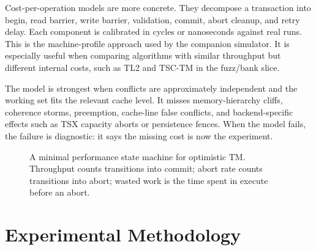 Cost-per-operation models are more concrete. They decompose a transaction into begin, read barrier, write barrier, validation, commit, abort cleanup, and retry delay. Each component is calibrated in cycles or nanoseconds against real runs. This is the machine-profile approach used by the companion simulator. It is especially useful when comparing algorithms with similar throughput but different internal costs, such as TL2 and TSC-TM in the fuzz/bank slice.

The model is strongest when conflicts are approximately independent and the working set fits the relevant cache level. It misses memory-hierarchy cliffs, coherence storms, preemption, cache-line false conflicts, and backend-specific effects such as TSX capacity aborts or persistence fences. When the model fails, the failure is diagnostic: it says the missing cost is now the experiment.

\begin{figure}[htbp]
\centering
{}
\caption{A minimal performance state machine for optimistic TM. Throughput counts transitions into commit; abort rate counts transitions into abort; wasted work is the time spent in execute before an abort.}
\label{fig:perf-state-machine}
\end{figure}

\section{Experimental Methodology}
\label{sec:experimental-setup}


